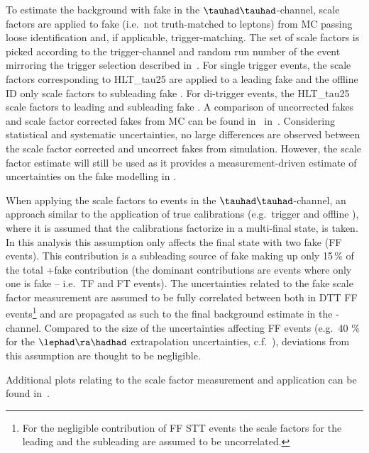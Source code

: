 To estimate the \ttbar background with fake \tauhad in the
$\tauhad\tauhad$-channel, scale factors are applied to fake \tauhad
(i.e.\ \tauhad not truth-matched to leptons) from \ttbar MC passing
loose identification and, if applicable, trigger-matching. The set of
scale factors is picked according to the trigger-channel and random
run number of the event mirroring the trigger selection described
in~. For single \tauhad trigger
events, the scale factors corresponding to HLT\_tau25 are applied to a
leading fake \tauhad and the offline ID only scale factors to
subleading fake \tauhad. For di-\tauhad trigger events, the HLT\_tau25
scale factors to leading and subleading fake \tauhad. A comparison of
uncorrected fakes and scale factor corrected fakes from \ttbar MC can
be found in~
in~. Considering statistical
and systematic uncertainties, no large differences are observed
between the scale factor corrected and uncorrect \tauhad fakes from
simulation. However, the scale factor estimate will still be used as
it provides a measurement-driven estimate of uncertainties on the fake
\tauhad modelling in \ttbar.

When applying the scale factors to events in the
$\tauhad\tauhad$-channel, an approach similar to the application of
true \tauhad calibrations (e.g.\ trigger and offline \tauhad), where
it is assumed that the calibrations factorize in a multi-\tauhad final
state, is taken. In this analysis this assumption only affects the
\ttbar final state with two fake \tauhad (FF events). This
contribution is a subleading source of fake \tauhad making up only
15\,\% of the total \ttbar+fake \tauhad contribution (the dominant
contributions are events where only one \tauhad is fake -- i.e.\ TF
and FT events). The uncertainties related to the fake scale factor
measurement are assumed to be fully correlated between both \tauhad in
DTT FF events\footnote{For the negligible contribution of FF STT
  events the scale factors for the leading and the subleading \tauhad
  are assumed to be uncorrelated.} and are propagated as such to the
final background estimate in the \hadhad-channel. Compared to the size
of the uncertainties affecting FF events (e.g.\ 40 \% for the
$\lephad \ra \hadhad$ extrapolation uncertainties, c.f.\
), deviations from this assumption
are thought to be negligible.

Additional plots relating to the scale factor measurement and
application can be found in~.

